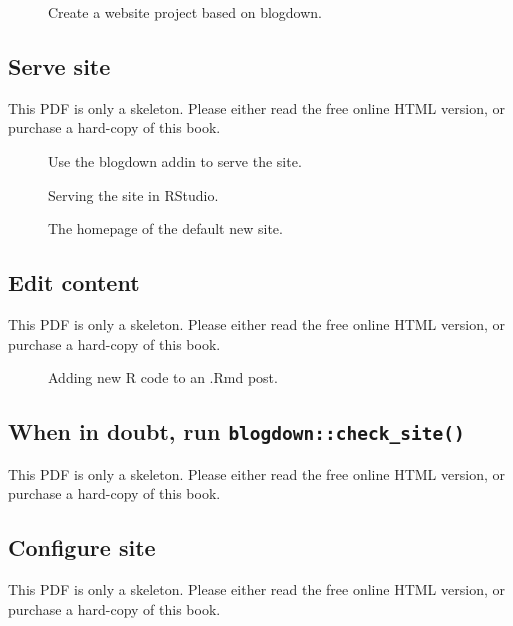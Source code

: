 \documentclass[
  12pt,
]{krantz}
\begin{document}
\begin{figure}\caption{Create a website project based on blogdown.}\end{figure}

\subsection{Serve site}\label{serve-site}

This PDF is only a skeleton. Please either read the free online HTML version, or purchase a hard-copy of this book.

\begin{figure}\caption{Use the blogdown addin to serve the site.}\end{figure}

\begin{figure}\caption{Serving the site in RStudio.}\end{figure}

\begin{figure}\caption{The homepage of the default new site.}\end{figure}

\subsection{Edit content}\label{edit-content}

This PDF is only a skeleton. Please either read the free online HTML version, or purchase a hard-copy of this book.

\begin{figure}\caption{Adding new R code to an .Rmd post.}\end{figure}

\subsection{\texorpdfstring{When in doubt, run \texttt{blogdown::check\_site()}}{When in doubt, run blogdown::check\_site()}}\label{when-in-doubt-run-blogdowncheck_site}

This PDF is only a skeleton. Please either read the free online HTML version, or purchase a hard-copy of this book.

\subsection{Configure site}\label{configure-site}

This PDF is only a skeleton. Please either read the free online HTML version, or purchase a hard-copy of this book.
\end{document}
